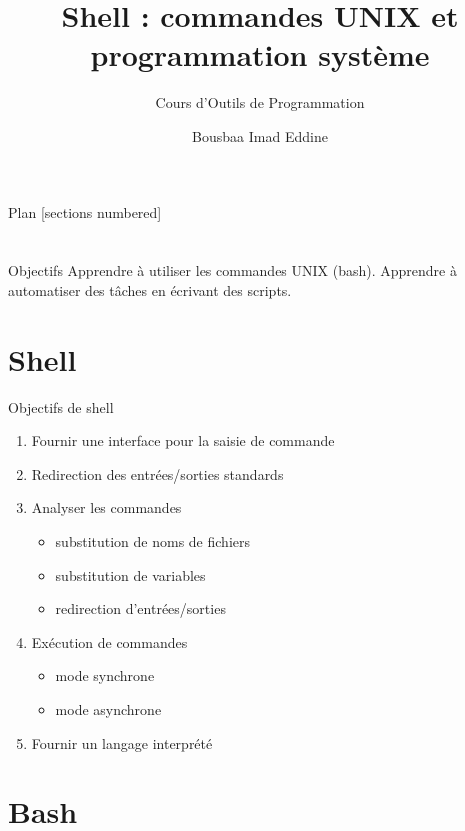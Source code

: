 \documentclass[10pt]{beamer}
\title{Shell : commandes UNIX et programmation système}
\subtitle{Cours d'Outils de Programmation}
\date{}
\author{Bousbaa Imad Eddine}
\institute{Université des Sciences et de la Technologie de Houari Boumediène}
\begin{document}
\maketitle

\begin{frame}{Plan}
  [sections numbered]
  \tableofcontents[hideallsubsections]
\end{frame}

\section{}

\begin{frame}[fragile]{Objectifs}
Apprendre à utiliser les commandes UNIX (bash).
Apprendre à automatiser des tâches en écrivant des scripts.\\

\end{frame}

\section{Shell}

\begin{frame}{Objectifs de shell}
\begin{enumerate}
\item Fournir une interface pour la saisie de commande
\item Redirection des entrées/sorties standards
\item Analyser les commandes
\begin{itemize}
	\item substitution de noms de fichiers
	\item substitution de variables
	\item redirection d’entrées/sorties
\end{itemize}
\item Exécution de commandes
\begin{itemize}
\item mode synchrone
\item mode asynchrone
\end{itemize}
\item Fournir un langage interprété
\end{enumerate}
\end{frame}



\section{Bash}
\end{document}
